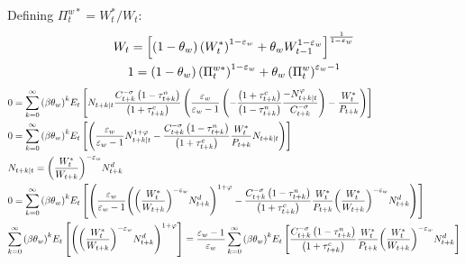 \documentclass[12pt,a4paper]{article}
\begin{document}
Defining $\Pi_t^{w*}=W_t^*/W_t$:
\[\begin{gathered}
  {W_t} = {\left[ {\left( {1 - {\theta _w}} \right){{\left( {W_t^*} \right)}^{1 - {\varepsilon _w}}} + {\theta _w}W_{t - 1}^{1 - {\varepsilon _w}}} \right]^{\frac{1}{{1 - {\varepsilon _w}}}}} \hfill \\
  1={\left( {1 - {\theta _w}} \right){{\left( {\Pi_t^{w*}} \right)}^{1 - {\varepsilon _w}}} + {\theta _w}\left(\Pi_{t}^w\right)^{{\varepsilon _w}-1}}
\end{gathered} \]
\[\begin{gathered}
  0 = \sum\limits_{k = 0}^\infty  {{{\left( {\beta {\theta _w}} \right)}^k}} {E_t}\left[ {{N_{t + k|t}}\frac{{C_{t + k}^{ - \sigma }\left( {1 - \tau _{t + k}^n} \right)}}{{\left( {1 + \tau _{t + k}^c} \right)}}\left( {\frac{{{\varepsilon _w}}}{{{\varepsilon _w} - 1}}\left( { - \frac{{\left( {1 + \tau _{t + k}^c} \right)}}{{\left( {1 - \tau _{t + k}^n} \right)}}\frac{{ - N_{t + k|t}^\varphi }}{{C_{t + k}^{ - \sigma }}}} \right) - \frac{{W_t^*}}{{{P_{t + k}}}}} \right)} \right] \hfill \\
  0 = \sum\limits_{k = 0}^\infty  {{{\left( {\beta {\theta _w}} \right)}^k}} {E_t}\left[ {\left( {\frac{{{\varepsilon _w}}}{{{\varepsilon _w} - 1}}N_{t + k|t}^{1 + \varphi } - \frac{{C_{t + k}^{ - \sigma }\left( {1 - \tau _{t + k}^n} \right)}}{{\left( {1 + \tau _{t + k}^c} \right)}}\frac{{W_t^*}}{{{P_{t + k}}}}{N_{t + k|t}}} \right)} \right] \hfill \\
  {N_{t + k|t}} = {\left( {\frac{{W_t^*}}{{{W_{t + k}}}}} \right)^{ - {\varepsilon _w}}}N_{t + k}^d \hfill \\
  0 = \sum\limits_{k = 0}^\infty  {{{\left( {\beta {\theta _w}} \right)}^k}} {E_t}\left[ {\left( {\frac{{{\varepsilon _w}}}{{{\varepsilon _w} - 1}}{{\left( {{{\left( {\frac{{W_t^*}}{{{W_{t + k}}}}} \right)}^{ - {\varepsilon _w}}}N_{t + k}^d} \right)}^{1 + \varphi }} - \frac{{C_{t + k}^{ - \sigma }\left( {1 - \tau _{t + k}^n} \right)}}{{\left( {1 + \tau _{t + k}^c} \right)}}\frac{{W_t^*}}{{{P_{t + k}}}}{{\left( {\frac{{W_t^*}}{{{W_{t + k}}}}} \right)}^{ - {\varepsilon _w}}}N_{t + k}^d} \right)} \right] \hfill \\
  \sum\limits_{k = 0}^\infty  {{{\left( {\beta {\theta _w}} \right)}^k}} {E_t}\left[ {{{\left( {{{\left( {\frac{{W_t^*}}{{{W_{t + k}}}}} \right)}^{ - {\varepsilon _w}}}N_{t + k}^d} \right)}^{1 + \varphi }}} \right] = \frac{{{\varepsilon _w} - 1}}{{{\varepsilon _w}}}\sum\limits_{k = 0}^\infty  {{{\left( {\beta {\theta _w}} \right)}^k}} {E_t}\left[ {\frac{{C_{t + k}^{ - \sigma }\left( {1 - \tau _{t + k}^n} \right)}}{{\left( {1 + \tau _{t + k}^c} \right)}}\frac{{W_t^*}}{{{P_{t + k}}}}{{\left( {\frac{{W_t^*}}{{{W_{t + k}}}}} \right)}^{ - {\varepsilon _w}}}N_{t + k}^d} \right] \hfill \\

\end{gathered}\]
\end{document}

